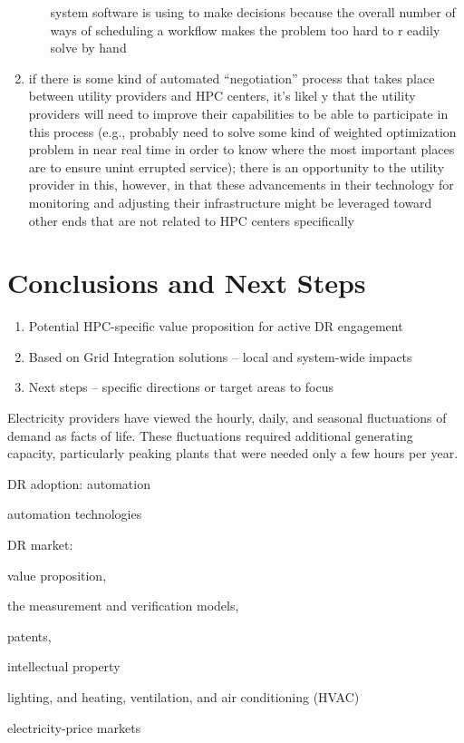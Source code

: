 \documentclass{llncs}
\begin{document}
\begin{enumerate}
\begin{itemize}
 system software is using to make decisions because the overall number of ways of scheduling a workflow makes the problem too hard to r
eadily solve by hand
        \end{itemize}
\item if there is some kind of automated ``negotiation'' process that takes place between utility providers and HPC centers, it's likel
y that the utility providers will need to improve their capabilities to be able to participate in this process (e.g., probably need to
solve some kind of weighted optimization problem in near real time in order to know where the most important places are to ensure unint
errupted service); there is an opportunity to the utility provider in this, however, in that these advancements in their technology for
 monitoring and adjusting their infrastructure might be leveraged toward other ends that are not related to HPC centers specifically
\end{enumerate}


\section{Conclusions and Next Steps}

\begin{enumerate}
\item Potential HPC-specific value proposition for active DR engagement
\item Based on Grid Integration solutions -- local and system-wide impacts
\item Next steps -- specific directions or target areas to focus
\end{enumerate}

Electricity providers have viewed the hourly, daily, and seasonal
fluctuations of demand as facts of life. These fluctuations required
additional generating capacity, particularly peaking plants that were needed
only a few hours per year.

DR adoption: automation

automation technologies

DR market:

value proposition,

the measurement and verification models,

patents,

intellectual property

lighting, and heating, ventilation, and air conditioning (HVAC)

electricity-price markets
\end{document}
